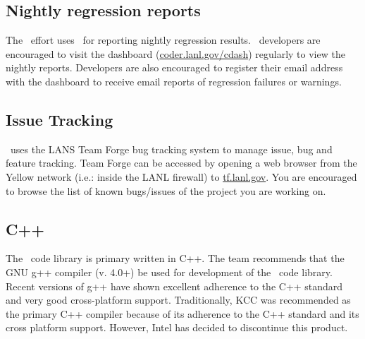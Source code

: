 \subsection{Nightly regression reports}

The \draco\ effort uses \cdash\ for reporting nightly regression
results.  \draco\ developers are encouraged to visit the dashboard
(\url{coder.lanl.gov/cdash}) regularly to view the nightly reports.
Developers are also encouraged to register their email address with
the dashboard to receive email reports of regression failures or
warnings.

\subsection{Issue Tracking}

\draco\ uses the LANS Team Forge bug tracking system to manage issue,
bug and feature tracking.  Team Forge can be accessed by opening a web
browser from the Yellow network (i.e.: inside the LANL firewall) to
\url{tf.lanl.gov}.  You are encouraged to browse the list of known
bugs/issues of the project you are working on.



\subsection{C++}

The \draco\ code library is primary written in C++.  The team
recommends that the GNU g++ compiler (v. 4.0+) be used for development
of the \draco\ code library.  Recent versions of g++ have shown
excellent adherence to the C++ standard and very good cross-platform
support. Traditionally, KCC was recommended as the primary C++
compiler because of its adherence to the C++ standard and its cross
platform support.  However, Intel has decided to discontinue this
product.  

